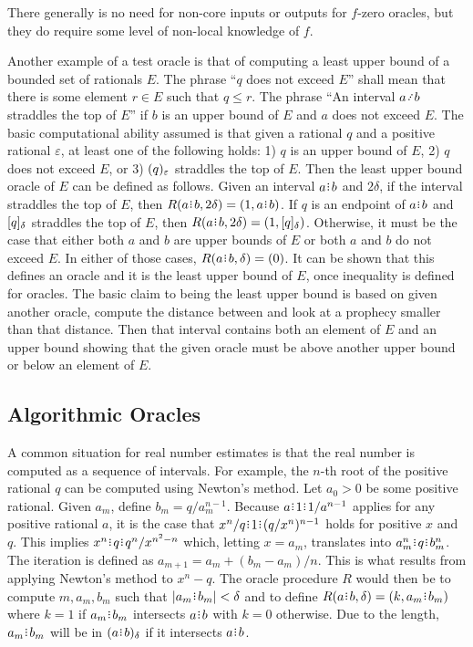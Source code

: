 \documentclass[12pt]{article}
\begin{document}
There generally is no need for non-core inputs or outputs for $f$-zero oracles, but they do require some level of non-local knowledge of $f$. 

Another example of a test oracle is that of computing a least upper bound of a bounded set of rationals $E$. The phrase ``$q$ does not exceed $E$'' shall mean that there is some element $r \in E$ such that $q \leq r$. The phrase ``An interval $a \lte b$ straddles the top of $E$'' if $b$ is an upper bound of $E$ and $a$ does not exceed $E$. The basic computational ability assumed is that given a rational $q$ and a positive rational $\varepsilon$, at least one of the following holds: 1) $q$ is an upper bound of $E$, 2) $q$ does not exceed $E$, or 3)  $\halo[\varepsilon]{q}$ straddles the top of $E$. Then the least upper bound oracle of $E$ can be defined as follows. Given an interval $a \rint  b$ and $2 \delta$, if the interval straddles the top of $E$, then $R(a \rint  b, 2\delta) = (1, a\rint b)$. If $q$ is an endpoint of $a\rint b$ and  $\clhalo{q}$ straddles the top of $E$, then $R(a\rint b, 2\delta)= (1, \clhalo{q})$. Otherwise, it must be the case that either both $a$ and $b$ are upper bounds of $E$ or both $a$ and $b$ do not exceed $E$. In either of those cases, $R(a \rint b, \delta) = (0)$. It can be shown that this defines an oracle and it is the least upper bound of $E$, once inequality is defined for oracles. The basic claim to being the least upper bound is based on given another oracle, compute the distance between and look at a prophecy smaller than that distance. Then that interval contains both an element of $E$ and an upper bound showing that the given oracle must be above another upper bound or below an element of $E$.




\subsection{Algorithmic Oracles}\label{os-sect-algo}


A common situation for real number estimates is that the real number is computed as a sequence of intervals. For example, the $n$-th root of the positive rational $q$ can be computed using Newton's method. Let $a_0 >0$ be some positive rational. Given $a_m$, define $b_m = q/a_m^{n-1}$. Because $a \rint 1 \rint 1/a^{n-1}$ applies for any positive rational $a$, it is the case that  $x^n/q \rint 1 \rint (q/x^n)^{n-1}$ holds for positive $x$ and $q$. This implies $x^n \rint q \rint q^n/x^{n^2 -n}$ which, letting $x = a_m$, translates into  $a_m^n \rint  q \rint  b_m^n$. The iteration is defined as $a_{m+1} = a_m + (b_m - a_m)/n$. This is what results from applying Newton's method to $x^n - q$. The oracle procedure $R$ would then be to compute $m, a_m, b_m$ such that $|a_m \rint  b_m| < \delta$ and to define $R(a\rint b, \delta) = (k, a_m\rint b_m)$ where $k=1$ if $a_m\rint b_m$ intersects $a\rint b$ with $k =0$ otherwise. Due to the length, $a_m\rint b_m$ will be in $\halo{a\rint b}$ if it intersects $a\rint b$. 
\end{document}
